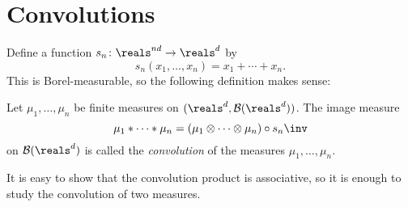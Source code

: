 \documentclass[article, a4paper, 11pt, oneside]{memoir}
\title{\doctitle}
\author{\docauthor}
\numberwithin{equation}{chapter}
\newcommand{\calB}{\mathcal{B}}
\newcommand{\borel}[1]{\calB(#1)}
\begin{document}
\maketitle

\chapter{Convolutions}

\newcommand{\tensor}{\otimes}

Define a function $s_n \colon \reals^{nd} \to \reals^d$ by
%
\begin{equation*}
    s_n(x_1, \ldots, x_n)
        = x_1 + \cdots + x_n.
\end{equation*}
%
This is Borel-measurable, so the following definition makes sense:

\begin{definition}
    Let $\mu_1, \ldots, \mu_n$ be finite measures on $(\reals^d, \borel{\reals^d})$. The image measure
    \begin{equation*}
        \mu_1 * \cdots * \mu_n
            = (\mu_1 \tensor \cdots \tensor \mu_n) \circ s_n\inv
    \end{equation*}
    on $\borel{\reals^d}$ is called the \emph{convolution} of the measures $\mu_1, \ldots, \mu_n$.
\end{definition}
%
It is easy to show that the convolution product is associative, so it is enough to study the convolution of two measures.
\end{document}
